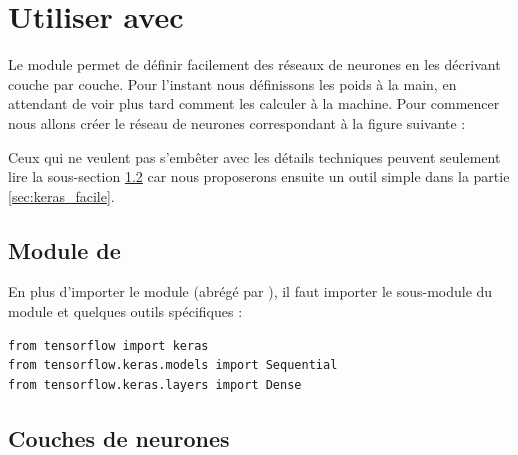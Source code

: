 \documentclass[11pt,class=report,crop=false]{standalone}
\begin{document}



\section{Utiliser \tensorflow{} avec \keras}

Le module \keras{} permet de définir facilement des réseaux de neurones en les décrivant couche par couche.
Pour l'instant nous définissons les poids à la main, en attendant de voir plus tard comment les calculer à la machine.
Pour commencer nous allons créer le réseau de neurones correspondant à la figure suivante :



Ceux qui ne veulent pas s'embêter avec les détails techniques peuvent seulement lire la sous-section \ref{ssec:couches} car nous proposerons ensuite un outil simple dans la partie \ref{sec:keras_facile}.


\subsection{Module \keras{} de \tensorflow{}}
\label{ssec:keras}

En plus d'importer le module  (abrégé par ), il faut importer le sous-module  du module  et quelques outils spécifiques :

\begin{lstlisting}
from tensorflow import keras
from tensorflow.keras.models import Sequential
from tensorflow.keras.layers import Dense
\end{lstlisting} 


\subsection{Couches de neurones}
\label{ssec:couches}
\end{document}

